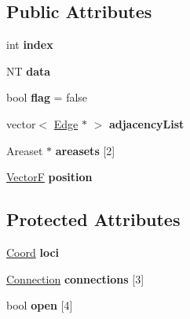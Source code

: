 \subsection*{Public Attributes}
\begin{DoxyCompactItemize}
\item 
\hypertarget{structNode_ac8055cdbda20cacce417192557741ab8}{int {\bfseries index}}\label{structNode_ac8055cdbda20cacce417192557741ab8}

\item 
\hypertarget{structNode_a877334dd39251c18f156f154dcf5c141}{N\+T {\bfseries data}}\label{structNode_a877334dd39251c18f156f154dcf5c141}

\item 
\hypertarget{structNode_a1bd87c82dccda0e8efdaef5f19de558b}{bool {\bfseries flag} = false}\label{structNode_a1bd87c82dccda0e8efdaef5f19de558b}

\item 
\hypertarget{structNode_ac20d9a187c73ffd00cbaa79e636a963b}{vector$<$ \hyperlink{structEdge}{Edge} $\ast$ $>$ {\bfseries adjacency\+List}}\label{structNode_ac20d9a187c73ffd00cbaa79e636a963b}

\item 
\hypertarget{structNode_a7771548b1788566ae2af70da09edd3e0}{Areaset $\ast$ {\bfseries areasets} \mbox{[}2\mbox{]}}\label{structNode_a7771548b1788566ae2af70da09edd3e0}

\item 
\hypertarget{structNode_a47b5558f6416791a4789051c64411c3e}{\hyperlink{structVectorF}{Vector\+F} {\bfseries position}}\label{structNode_a47b5558f6416791a4789051c64411c3e}

\end{DoxyCompactItemize}
\subsection*{Protected Attributes}
\begin{DoxyCompactItemize}
\item 
\hypertarget{structNode_ab53dfd4d0c1c14c6f52e10e7dd4a7d5b}{\hyperlink{structCoord}{Coord} {\bfseries loci}}\label{structNode_ab53dfd4d0c1c14c6f52e10e7dd4a7d5b}

\item 
\hypertarget{structNode_a8c1d4129f3781fc13810790f4f263fc0}{\hyperlink{structConnection}{Connection} {\bfseries connections} \mbox{[}3\mbox{]}}\label{structNode_a8c1d4129f3781fc13810790f4f263fc0}

\item 
\hypertarget{structNode_aeb24c6e7916dd967c826084094f71e63}{bool {\bfseries open} \mbox{[}4\mbox{]}}\label{structNode_aeb24c6e7916dd967c826084094f71e63}

\end{DoxyCompactItemize}
